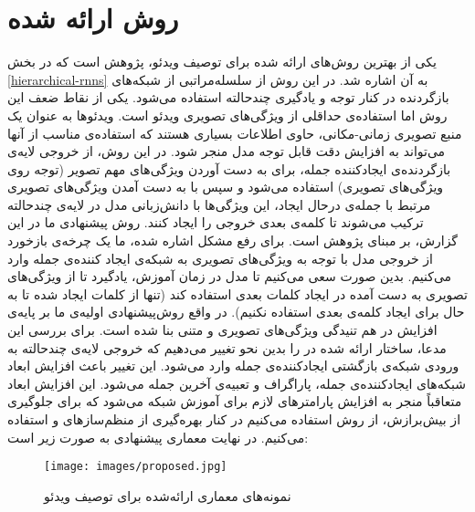 \section{روش ارائه شده}\label{proposed}
یکی از بهترین روش‌های ارائه شده برای توصیف ویدئو، پژوهش 
\cite{Yu2016}
است که در بخش 
\ref{hierarchical-rnns}
به آن اشاره شد. در این روش از سلسله‌مراتبی از شبکه‌های بازگردنده در کنار توجه و یادگیری چندحالته استفاده می‌شود. یکی از نقاط ضعف این روش اما استفاده‌ی حداقلی از ویژگی‌های تصویری ویدئو است. ویدئو‌ها به عنوان یک منبع تصویری زمانی-مکانی، حاوی اطلاعات بسیاری هستند که استفاده‌ی مناسب از آنها می‌تواند به افزایش دقت قابل توجه مدل منجر شود.  در این روش، از خروجی لایه‌ی بازگردنده‌ی ایجاد‌کننده جمله، برای به دست آوردن ویژگی‌های مهم تصویر (توجه روی ویژگی‌های تصویری) استفاده می‌شود و سپس با به دست آمدن ویژگی‌های تصویری مرتبط با جمله‌ی درحال ایجاد، این ویژگی‌ها با دانش‌زبانی مدل در لایه‌ی چند‌حالته ترکیب می‌شوند تا کلمه‌ی بعدی خروجی را ایجاد کنند.
روش پیشنهادی ما در این گزارش، بر مبنای پژوهش \cite{Yu2016} است. برای رفع مشکل اشاره شده، ما یک چرخه‌ی بازخورد از خروجی مدل با توجه به ویژگی‌های تصویری به شبکه‌ی ایجاد کننده‌ی جمله وارد می‌کنیم. بدین صورت سعی می‌کنیم تا مدل در زمان آموزش، یادگیرد تا از ویژگی‌های تصویری به دست آمده در ایجاد کلمات بعدی استفاده کند (تنها از کلمات ایجاد شده تا به حال برای ایجاد کلمه‌ی بعدی استفاده نکنیم). در واقع روش‌پیشنهادی اولیه‌ی ما بر پایه‌ی افزایش در هم تنیدگی ویژگی‌های تصویری و متنی بنا شده است.
برای بررسی این مدعا،  ساختار  ارائه شده در \cite{Yu2016} را بدین نحو تغییر می‌دهیم که خروجی لایه‌ی چند‌حالته به ورودی شبکه‌ی بازگشتی ایجاد‌کننده‌ی جمله وارد می‌شود. این تغییر باعث افزایش ابعاد شبکه‌های ایجاد‌کننده‌ی جمله، پاراگراف و تعبیه‌ی آخرین جمله می‌شود. این افزایش ابعاد متعاقباً منجر به افزایش پارامتر‌های لازم برای آموزش شبکه می‌شود که برای جلوگیری از بیش‌برازش، از روش 
استفاده می‌کنیم در کنار بهره‌گیری از منظم‌ساز‌های  و  استفاده می‌کنیم. در نهایت معماری پیشنهادی به صورت زیر است:

\begin{figure}[ht!]
	\centering
	\texttt{[image: images/proposed.jpg]}
	\caption{نمونه‌های معماری ارائه‌شده برای توصیف ویدئو}
\end{figure}


